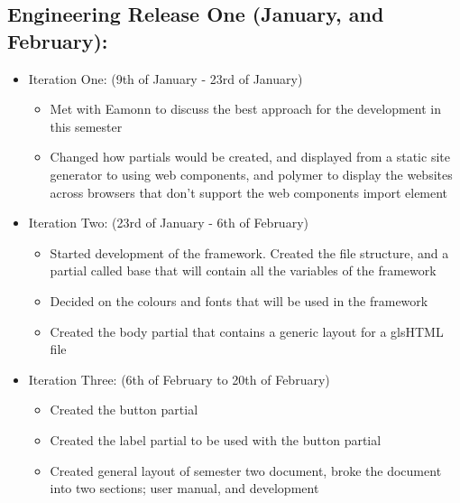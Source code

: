\subsection*{Engineering Release One (January, and February):}
\begin{itemize}
	\item Iteration One: (9th of January - 23rd of January)\begin{itemize} 
	\item Met with Eamonn to discuss the best approach for the development in this semester
	\item Changed how partials would be created, and displayed from a static site generator to using web components, and polymer to display the websites across browsers that don't support the web components import element
	\end{itemize}
	\item Iteration Two: (23rd of January - 6th of February) \begin{itemize}
	\item Started development of the framework. Created the file structure, and a partial called base that will contain all the variables of the framework
	\item Decided on the colours and fonts that will be used in the framework
	\item Created the body partial that contains a generic layout for a gls{HTML} file
	\end{itemize}
	\item Iteration Three: (6th of February to 20th of February)\begin{itemize}
	\item Created the button partial
	\item Created the label partial to be used with the button partial
	\item Created general layout of semester two document, broke the document into two sections; user manual, and development
	\end{itemize}

\end{itemize}
